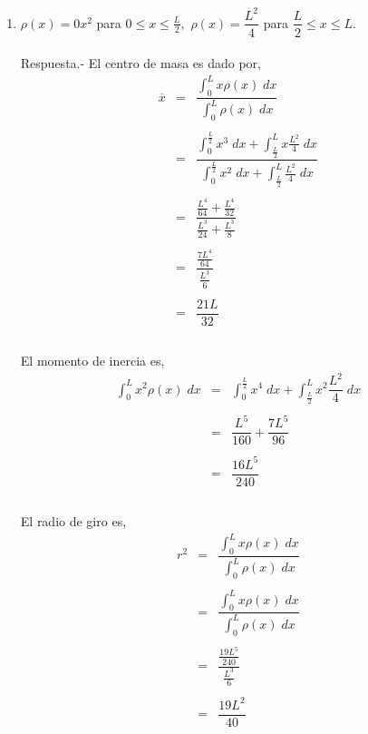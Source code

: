 \begin{enumerate}[\bfseries 1.]
\item $\rho(x)=0x^2$ para $0\leq x\leq \frac{L}{2},$ $\rho(x)=\dfrac{L^2}{4}$ para $\dfrac{L}{2}\leq x \leq L$.\\\\
    Respuesta.-\; El centro de masa es dado por,
    $$\begin{array}{rcl}
	\overline{x}&=&\dfrac{\int_0^L x\rho(x)\; dx}{\int_0^L \rho(x)\; dx}\\\\
		    &=&\dfrac{\int_0^{\frac{L}{2}}x^3\; dx + \int_{\frac{L}{2}}^L x\frac{L^2}{4}\; dx}{\int_0^{\frac{L}{2}} x^2\; dx + \int_{\frac{L}{2}}^L \frac{L^2}{4}\; dx}\\\\
		    &=&\dfrac{\frac{L^4}{64}+\frac{L^4}{32}}{\frac{L^3}{24}+\frac{L^3}{8}}\\\\
		    &=&\dfrac{\frac{7L^4}{64}}{\frac{L^3}{6}}\\\\
		    &=&\dfrac{21L}{32}\\\\
    \end{array}$$

    El momento de inercia es,
    $$\begin{array}{rcl}
	\displaystyle\int_0^L x^2 \rho(x)\; dx&=&\displaystyle\int_0^{\frac{L}{2}}x^4\; dx + \int_{\frac{L}{2}}^L x^2 \dfrac{L^2}{4}\; dx\\\\
					      &=&\dfrac{L^5}{160}+\dfrac{7L^5}{96}\\\\
					      &=&\dfrac{16L^5}{240}\\\\
    \end{array}$$

    El radio de giro es,
    $$\begin{array}{rcl}
	r^2&=&\dfrac{\int_0^L x\rho(x)\; dx}{\int_0^L \rho(x)\; dx}\\\\
	   &=&\dfrac{\int_0^L x \rho(x)\; dx}{\int_0^L \rho(x)\; dx}\\\\
	   &=&\dfrac{\frac{19L^5}{240}}{\frac{L^3}{6}}\\\\
	   &=&\dfrac{19L^2}{40}\\\\
    \end{array}$$


\end{enumerate}
